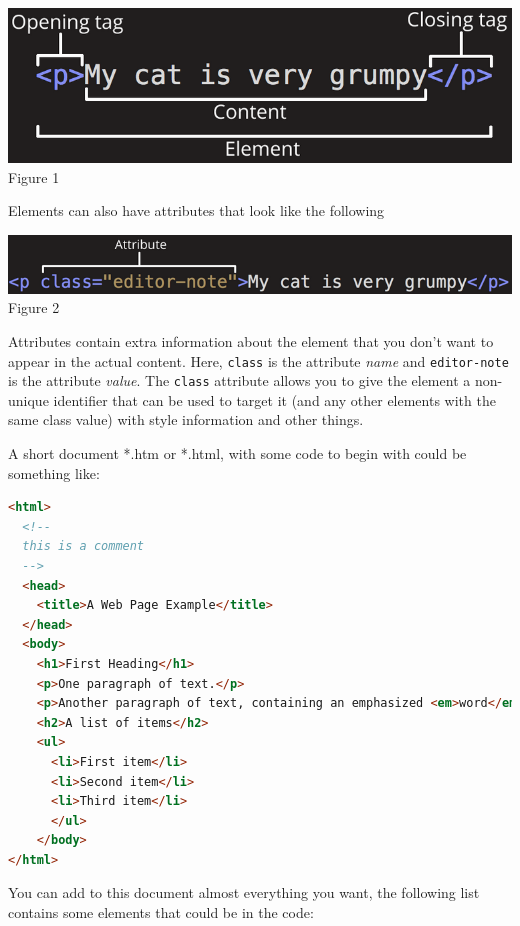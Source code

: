 \documentclass{article}
\begin{document}
    \begin{center}
    	\includegraphics[scale=0.4]{HTML_el.png}\\
    	\footnotesize Figure 1
    \end{center}
    
    \noindent Elements can also have attributes that look like the following
    
    \begin{center}
    	\includegraphics[scale=0.4]{HTML_el_att.png}\\
    	\footnotesize Figure 2
    \end{center}

    Attributes contain extra information about the element that you don't want to appear in the actual content. Here, {\tt class} is the attribute \textit{name} and {\tt editor-note} is the attribute \textit{value}. The {\tt class} attribute allows you to give the element a non-unique identifier that can be used to target it (and any other elements with the same class value) with style information and other things. \par
    
    A short document *.htm or *.html, with some code to begin with could be something like:
    
    \begin{lstlisting}[language=html]
<html>
  <!-- 
  this is a comment
  -->
  <head>
    <title>A Web Page Example</title>
  </head>
  <body>
    <h1>First Heading</h1>
    <p>One paragraph of text.</p>
    <p>Another paragraph of text, containing an emphasized <em>word</em>.</p>
    <h2>A list of items</h2>
    <ul>
      <li>First item</li>
      <li>Second item</li>
      <li>Third item</li>
      </ul>
    </body>
</html>
    \end{lstlisting}

    You can add to this document almost everything you want, the following list contains some elements that could be in the code:
\end{document}
